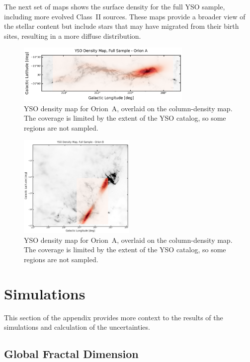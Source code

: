 The next set of maps shows the surface density for the full YSO sample, including more evolved Class~II sources.  
These maps provide a broader view of the stellar content but include stars that may have migrated from their birth sites, resulting in a more diffuse distribution.

\begin{figure}[h]
    \centering
    \includegraphics[width=0.75\textwidth]{figures/YSOs_density_Orion_A.png}
    \caption{YSO density map for Orion~A, overlaid on the column-density map. The coverage is limited by the extent of the YSO catalog, so some regions are not sampled.}
    \label{fig:YSOs_density_Map_A}
\end{figure}

\begin{figure}[h]
    \centering
    \includegraphics[width=0.5\textwidth]{figures/YSOs_density_Orion_B.png}
    \caption{YSO density map for Orion~A, overlaid on the column-density map. The coverage is limited by the extent of the YSO catalog, so some regions are not sampled.}
    \label{fig:YSOs_density_Map_B}
\end{figure}

\section{Simulations}

This section of the appendix provides more context to the results of the simulations and calculation of the uncertainties.

\subsection{Global Fractal Dimension}

